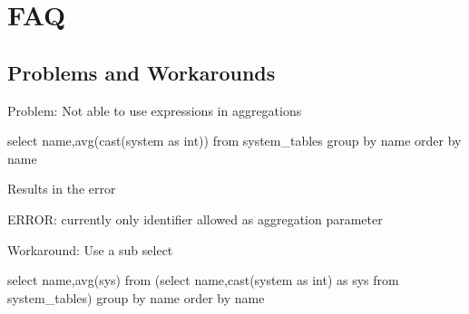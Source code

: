 
\chapter{FAQ}

\section{Problems and Workarounds}

Problem: Not able to use expressions in aggregations

\begin{SQL}
select name,avg(cast(system as int)) from system_tables group by name order by name
\end{SQL}

Results in the error

\begin{Bash}
ERROR: currently only identifier allowed as aggregation parameter
\end{Bash}

Workaround: Use a sub select

\begin{SQL}
select name,avg(sys) from (select name,cast(system as int) as sys from system_tables) group by name order by name
\end{SQL}

